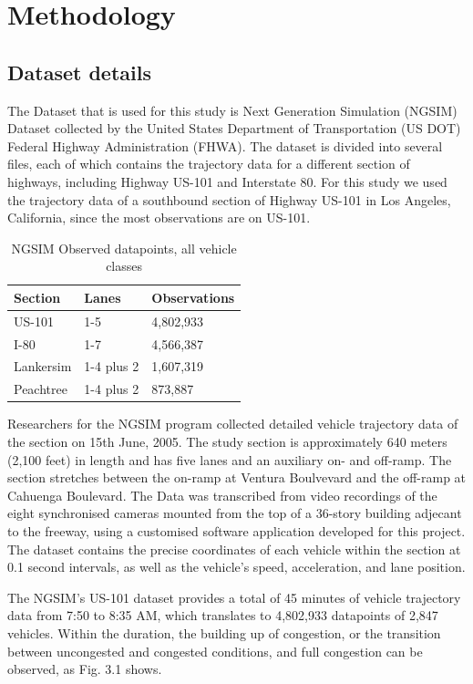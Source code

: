 \documentclass[11pt]{uonthesis}
\begin{document}
\chapter{Methodology}
\section{Dataset details}

The Dataset that is used for this study is Next Generation Simulation (NGSIM) Dataset collected by the United States Department of Transportation (US DOT) Federal Highway Administration (FHWA). The dataset is divided into several files, each of which contains the trajectory data for a different section of highways, including Highway US-101 and Interstate 80. For this study we used the trajectory data of a southbound section of Highway US-101 in Los Angeles, California, since the most observations are on US-101.

\begin{table}[ht!]
    \centering
    \begin{tabular}{ |p{3cm}|p{3cm}|p{3cm}| }
        \hline
        Section & Lanes & Observations\\
        \hline
        US-101 & 1-5 & 4,802,933\\
        I-80 & 1-7 & 4,566,387\\ 
        Lankersim & 1-4 plus 2 & 1,607,319\\
        Peachtree & 1-4 plus 2 & 873,887\\
        \hline
    \end{tabular}
\caption{NGSIM Observed datapoints, all vehicle classes}
\end{table}

Researchers for the NGSIM program collected detailed vehicle trajectory data of the section on 15th June, 2005. The study section is approximately 640 meters (2,100 feet) in length and has five lanes and an auxiliary on- and off-ramp. The section stretches between the on-ramp at Ventura Boulvevard and the off-ramp at Cahuenga Boulevard. The Data was transcribed from video recordings of the eight synchronised cameras mounted from the top of a 36-story building adjecant to the freeway, using a customised software application developed for this project. The dataset contains the precise coordinates of each vehicle within the section at 0.1 second intervals, as well as the vehicle's speed, acceleration, and lane position.

The NGSIM's US-101 dataset provides a total of 45 minutes of vehicle trajectory data from 7:50 to 8:35 AM, which translates to 4,802,933 datapoints of 2,847 vehicles. Within the duration, the building up of congestion, or the transition between uncongested and congested conditions, and full congestion can be observed, as Fig. 3.1 shows. %
\end{document}
